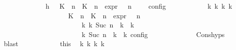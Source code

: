 \begin{isabellebody}
\ {\isacharminus}\isanewline
\ \ \ \ \ \ \ \ \ \ \isamarkupfalse%
\ h{\isacharcolon}{\isacartoucheopen}{\isasymrho}\ {\isasymin}\ {\isasymlbrakk}\ {\isacharparenleft}{\isacharparenleft}K\ {\isasymUp}\ n{\isacharparenright}\ {\isacharhash}\ {\isacharparenleft}K\ {\isasymDown}\ n\ {\isacharat}{\isasymsharp}\ {\isasymtau}\isactrlsub e\isactrlsub x\isactrlsub p\isactrlsub r{\isacharparenright}\ {\isacharhash}\ {\isasymGamma}{\isacharparenright}{\isacharcomma}\ n\ {\isasymturnstile}\ {\isasymPsi}\ {\isasymtriangleright}\ {\isasymPhi}\ {\isasymrbrakk}\isactrlsub c\isactrlsub o\isactrlsub n\isactrlsub f\isactrlsub i\isactrlsub g{\isacartoucheclose}\isanewline
\ \ \ \ \ \ \ \ \ \ \isamarkupfalse%
\ {\isacartoucheopen}{\isasymexists}{\isasymGamma}\isactrlsub k\ {\isasymPsi}\isactrlsub k\ {\isasymPhi}\isactrlsub k\ k{\isachardot}\isanewline
\ \ \ \ \ \ \ \ \ \ \ \ \ \ \ \ \ \ \ \ {\isacharparenleft}{\isacharparenleft}{\isacharparenleft}{\isacharparenleft}K\ {\isasymUp}\ n{\isacharparenright}\ {\isacharhash}\ {\isacharparenleft}K\ {\isasymDown}\ n\ {\isacharat}{\isasymsharp}\ {\isasymtau}\isactrlsub e\isactrlsub x\isactrlsub p\isactrlsub r{\isacharparenright}\ {\isacharhash}\ {\isasymGamma}{\isacharparenright}{\isacharcomma}\ n\ {\isasymturnstile}\ {\isasymPsi}\ {\isasymtriangleright}\ {\isasymPhi}{\isacharparenright}\isanewline
\ \ \ \ \ \ \ \ \ \ \ \ \ \ \ \ \ \ \ \ \ \ \ \ {\isasymhookrightarrow}\isactrlbsup k\isactrlesup \ {\isacharparenleft}{\isasymGamma}\isactrlsub k{\isacharcomma}\ Suc\ n\ {\isasymturnstile}\ {\isasymPsi}\isactrlsub k\ {\isasymtriangleright}\ {\isasymPhi}\isactrlsub k{\isacharparenright}{\isacharparenright}\isanewline
\ \ \ \ \ \ \ \ \ \ \ \ \ \ \ \ \ \ \ \ {\isasymand}\ {\isasymrho}\ {\isasymin}\ {\isasymlbrakk}\ {\isasymGamma}\isactrlsub k{\isacharcomma}\ Suc\ n\ {\isasymturnstile}\ {\isasymPsi}\isactrlsub k\ {\isasymtriangleright}\ {\isasymPhi}\isactrlsub k\ {\isasymrbrakk}\isactrlsub c\isactrlsub o\isactrlsub n\isactrlsub f\isactrlsub i\isactrlsub g{\isacartoucheclose}\isanewline
\ \ \ \ \ \ \ \ \ \ \ \ \isamarkupfalse%
\ Cons{\isachardot}hyps\ \isamarkupfalse%
\ blast\isanewline
\ \ \ \ \ \ \ \ \ \ \isamarkupfalse%
\ this\ \isamarkupfalse%
\ {\isasymGamma}\isactrlsub k\ {\isasymPsi}\isactrlsub k\ {\isasymPhi}\isactrlsub k\ k\ \isanewline

\end{isabellebody}
